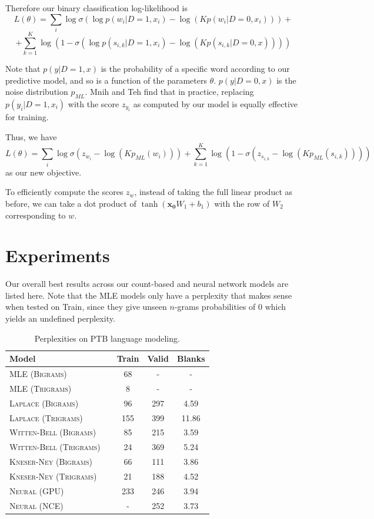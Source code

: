 \documentclass[11pt]{article}
\begin{document}
Therefore our binary classification log-likelihood is
$$L(\theta) = \sum_i \log \sigma(\log p(w_i | D = 1, x_i) - \log (Kp(w_i | D = 0, x_i))) + $$
$$+\sum_{k=1}^K \log (1 - \sigma(\log p(s_{i,k} | D = 1 , x_i) - \log(Kp(s_{i,k}| D = 0, x))))$$

Note that $p(y | D = 1, x)$ is the probability of a specific word according to our predictive model, and so is a function of the parameters $\theta$. $p(y | D = 0, x)$ is the noise distribution $p_{ML}$. Mnih and Teh find that in practice, replacing $p(y_i | D = 1, x_i)$ with the score $z_{y_i}$ as computed by our model is equally effective for training.

Thus, we have
$$L(\theta) = \sum_i \log \sigma(z_{w_i} - \log (Kp_{ML}(w_i))) + \sum_{k=1}^K \log(1 - \sigma(z_{s_{i,k}} - \log(Kp_{ML}(s_{i,k}))))$$
as our new objective.

To efficiently compute the scores $z_{w}$, instead of taking the full linear product as before, we can take a dot product of $\tanh(\mathbf{x_0}W_1 + b_1)$ with the row of $W_2$ corresponding to $w$.

\section{Experiments}

Our overall best results across our count-based and neural network models are listed here. Note that the MLE models only have a perplexity that makes sense when tested on Train, since they give unseen $n$-grams probabilities of $0$ which yields an undefined perplexity.

\begin{table}[h]
\centering
\begin{tabular}{llccc}
 \toprule
 Model &  & Train & Valid & Blanks\\
 \midrule
 \textsc{MLE (Bigrams)} & & 68 & - & - \\
 \textsc{MLE (Trigrams)} & & 8 & - & - \\
 \textsc{Laplace (Bigrams)} & & 96 & 297 & 4.59 \\
 \textsc{Laplace (Trigrams)} & & 155 & 399 & 11.86 \\
\textsc{Witten-Bell (Bigrams)} & & 85 & 215 & 3.59 \\
\textsc{Witten-Bell (Trigrams)} & & 24 & 369 & 5.24 \\
\textsc{Kneser-Ney (Bigrams)} & & 66 & 111 & 3.86 \\
\textsc{Kneser-Ney (Trigrams)} & & 21 & 188 & 4.52 \\
 \textsc{Neural (GPU)} & & 233 & 246 & 3.94\\
 \textsc{Neural (NCE)} & & - & 252 & 3.73 \\
 \bottomrule
\end{tabular}
\caption{\label{tab:results} Perplexities on PTB language modeling.}
\end{table}
\end{document}
